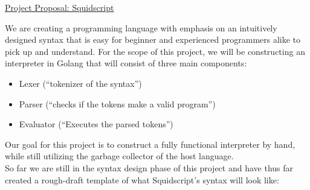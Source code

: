 \documentclass[12pt, letterpaper]{article}
\begin{document}
    \begin{center}
        \underline{Project Proposal: Squidscript}    
    \end{center}

We are creating a programming language with emphasis on an intuitively designed syntax that is easy for beginner and experienced programmers alike to pick up and understand. For the scope of this project, we will be constructing an interpreter in Golang that will consist of three main components:

\begin{itemize}

\item Lexer (“tokenizer of the syntax”)
\item Parser (“checks if the tokens make a valid program”)
\item Evaluator (“Executes the parsed tokens”)

\end{itemize}

Our goal for this project is to construct a fully functional interpreter by hand, while still utilizing the garbage collector of the host language. 
\\

So far we are still in the syntax design phase of this project and have thus far created a rough-draft template of what Squidscript’s syntax will look like:
\end{document}
